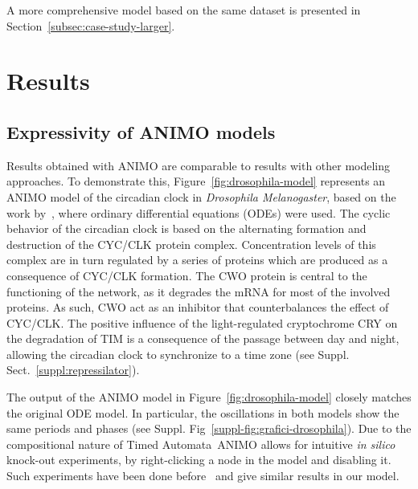 \documentclass{bmcart}
\def\tas{Timed Automata}
\begin{document}
A more comprehensive model based on the same dataset is presented in Section~\ref{subsec:case-study-larger}.







\section*{Results}\label{sec:results}
\subsection*{Expressivity of ANIMO models}\label{sec:animo-drosophila}
Results obtained with ANIMO are comparable to results with other modeling
approaches. To demonstrate this, Figure~\ref{fig:drosophila-model}
represents an ANIMO model of the circadian clock in \emph{Drosophila Melanogaster}, based on the work
by~\cite{drosophila-ode-model}, where ordinary differential equations (ODEs) were used.
The cyclic behavior of the circadian clock is based on the alternating formation and destruction of the
CYC/CLK protein complex.
Concentration levels of this complex are in turn regulated by a series of proteins which are produced as
a consequence of CYC/CLK formation. The CWO protein
is central to the functioning of the network, as it degrades the mRNA for most of the involved proteins.
As such, CWO act as an inhibitor that counterbalances the effect of CYC/CLK.
The positive influence of the light-regulated cryptochrome CRY on the degradation of TIM is a consequence
of the passage between day and night, allowing
the circadian clock to synchronize to a time zone (see Suppl. Sect.~\ref{suppl:repressilator}).




The output of the ANIMO model in Figure~\ref{fig:drosophila-model} closely matches the original ODE model.
In particular, the oscillations in both models show the same periods and phases (see Suppl. Fig~\ref{suppl-fig:grafici-drosophila}).
Due to the compositional nature of \tas\, ANIMO allows for intuitive \emph{in silico} knock-out experiments,
by right-clicking a node in the model and disabling it. Such experiments have been done
before~\cite{drosophila-ode-model} and give similar results in our model.
\end{document}
